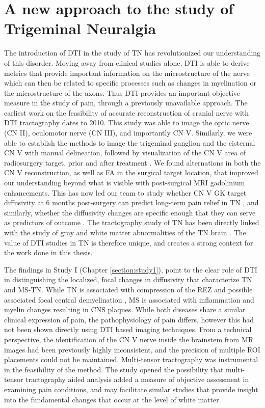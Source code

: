 \section{A new approach to the study of Trigeminal Neuralgia}


The introduction of DTI in the study of TN has revolutionized our understanding of this disorder. Moving away from clinical studies alone, DTI is able to derive metrics that provide important information on the microstructure of the nerve which can then be related to specific processes such as changes in myelination or the microstructure of the axons. Thus DTI provides an important objective measure in the study of pain, through a previously unavailable approach. The earliest work on the feasibility of accurate reconstruction of cranial nerve with DTI tractography \cite{Hodaie2010} dates to 2010. This study was able to image the optic nerve (CN II), oculomotor nerve (CN III), and importantly CN V. Similarly, we were able to establish the methods to image the trigeminal ganglion and the cisternal CN V with manual delineation, followed by visualization of the CN V area of radiosurgery target, prior and after treatment \cite{Hodaie2012g}. We found alternations in both the CN V reconstruction, as well as FA in the surgical target location, that improved our understanding beyond what is visible with post-surgical MRI gadolinium enhancements. This has now led our team to study whether CN V GK target diffusivity at 6 months post-surgery can predict long-term pain relief in TN \cite{Tohyama2018}, and similarly, whether the diffusivity changes are specific enough that they can serve as predictors of outcome \cite{Hung2017}. The tractography study of TN has been directly linked with the study of gray and white matter abnormalities of the TN brain \cite{Desouza2013c}. The value of DTI studies in TN is therefore unique, and creates a strong context for the work done in this thesis. 

The findings in Study I (Chapter \ref{section:study1}), point to the clear role of DTI in distinguishing the localized, focal changes in diffusivity that characterize TN and MS-TN. While TN is associated with compression of the REZ and possible associated focal central demyelination \cite{Devor2002a,Peker2006}, MS is associated with inflammation and myelin changes resulting in CNS plaques. While both diseases share a similar clinical expression of pain, the pathophysiology of pain differs, however this had not been shown directly using DTI based imaging techniques. From a technical perspective, the identification of the CN V nerve inside the brainstem from MR images had been previously highly inconsistent, and the precision of multiple ROI placements could not be maintained. Multi-tensor tractography was instrumental in the feasibility of the method. The study opened the possibility that multi-tensor tractography aided analysis added a measure of objective assessment in examining pain conditions, and may facilitate similar studies that provide insight into the fundamental changes that occur at the level of white matter. 

